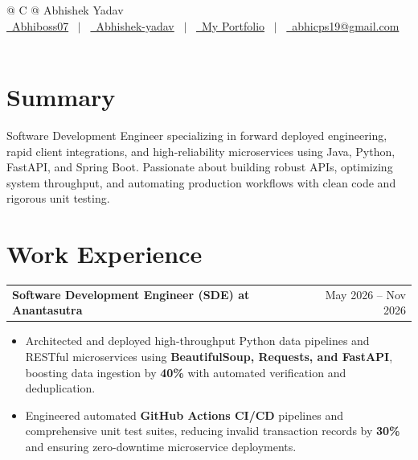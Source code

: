 \documentclass[a4paper,10pt]{article}
\makeatletter
\newenvironment{joblong}[2]
    {
    \begin{tabularx}{\linewidth}{@{}l X r@{}}
    \textbf{#1} & \hfill &  #2 \\[3.50pt]
    \end{tabularx}
    \begin{minipage}[t]{\linewidth}
    \begin{itemize}[nosep,after=\strut, leftmargin=1em, itemsep=3pt,label=--]
    }
    {
    \end{itemize}
    \end{minipage}
    }
\makeatother
\begin{document}
\pagestyle{empty}

\begin{tabularx}{\linewidth}{@{} C @{}}
\Huge{Abhishek Yadav}\\[7.5pt]
\href{https://github.com/Abhiboss07}{\raisebox{-0.05\height}\faGithub\ Abhiboss07} \ $|$ \
\href{https://linkedin.com/in/abhishek-yadav-4738032b7/}{\raisebox{-0.05\height}\faLinkedin\ Abhishek-yadav} \ $|$ \
\href{https://portfolio-abhishek-01.vercel.app}{\raisebox{-0.05\height}\faGlobe \ My Portfolio} \ $|$ \
\href{mailto:abhicps19@gmail.com}{\raisebox{-0.05\height}\faEnvelope \ abhicps19@gmail.com} \ \ \\
\end{tabularx}

\section{Summary}
Software Development Engineer specializing in forward deployed engineering, rapid client integrations, and high-reliability microservices using Java, Python, FastAPI, and Spring Boot. Passionate about building robust APIs, optimizing system throughput, and automating production workflows with clean code and rigorous unit testing.

\section{Work Experience}

\begin{joblong}{Software Development Engineer (SDE) at Anantasutra}{May 2026 -- Nov 2026}
\item Architected and deployed high-throughput Python data pipelines and RESTful microservices using \textbf{BeautifulSoup, Requests, and FastAPI}, boosting data ingestion by \textbf{40\%} with automated verification and deduplication.
\item Engineered automated \textbf{GitHub Actions CI/CD} pipelines and comprehensive unit test suites, reducing invalid transaction records by \textbf{30\%} and ensuring zero-downtime microservice deployments.
\end{joblong}
\end{document}
